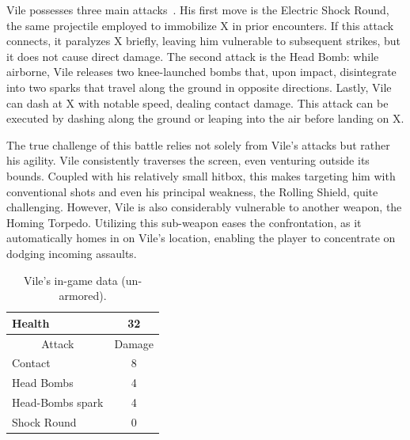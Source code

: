 Vile possesses three main attacks~\cite{wiki:Vile}. His first move is the Electric Shock Round, the same projectile employed to immobilize X in prior encounters. If this attack connects, it paralyzes X briefly, leaving him vulnerable to subsequent strikes, but it does not cause direct damage. The second attack is the Head Bomb: while airborne, Vile releases two knee-launched bombs that, upon impact, disintegrate into two sparks that travel along the ground in opposite directions. Lastly, Vile can dash at X with notable speed, dealing contact damage. This attack can be executed by dashing along the ground or leaping into the air before landing on X.

The true challenge of this battle relies not solely from Vile's attacks but rather his agility. Vile consistently traverses the screen, even venturing outside its bounds. Coupled with his relatively small hitbox, this makes targeting him with conventional shots and even his principal weakness, the Rolling Shield, quite challenging. However, Vile is also considerably vulnerable to another weapon, the Homing Torpedo. Utilizing this sub-weapon eases the confrontation, as it automatically homes in on Vile's location, enabling the player to concentrate on dodging incoming assaults.

\begin{table}
	\centering
	\begin{tabular}[htp]{l c}
		\toprule
		Health  & 32\\
		\midrule
		\multicolumn{1}{c}{Attack} & \multicolumn{1}{c}{Damage}\\
		Contact & 8\\
		Head Bombs & 4\\
		Head-Bombs spark & 4\\
		Shock Round & 0\\
		\bottomrule
	\end{tabular}
	\caption{Vile's in-game data (un-armored). }
\end{table}

